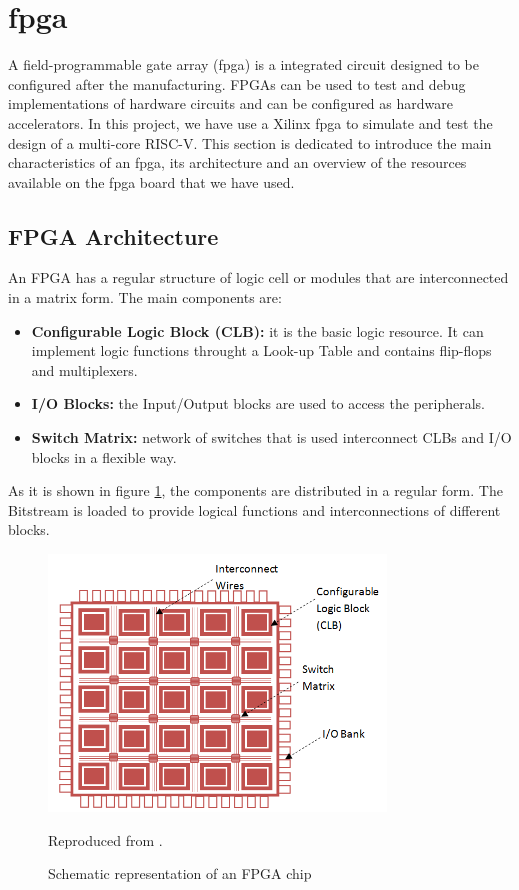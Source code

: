 \section{\gls{fpga}}

A field-programmable gate array (\gls{fpga}) is a integrated circuit designed to be configured after the manufacturing. FPGAs can be used to test and debug implementations of hardware circuits and can be configured as hardware accelerators. In this project, we have use a Xilinx \gls{fpga} to simulate and test the design of a multi-core RISC-V. This section is dedicated to introduce the main characteristics of an \gls{fpga}, its architecture and an overview of the resources available on the \gls{fpga} board that we have used.

\subsection{FPGA Architecture}
An FPGA has a regular structure of logic cell or modules that are interconnected in a matrix form. The main components are:

\begin{itemize}
	\item \textbf{Configurable Logic Block (CLB):} it is the basic logic resource. It can implement logic functions throught a Look-up Table and contains flip-flops and multiplexers. 
	\item \textbf{I/O Blocks:} the Input/Output blocks are used to access the peripherals. 
	\item \textbf{Switch Matrix:} network of switches that is used interconnect CLBs and I/O blocks in a flexible way.
\end{itemize}

As it is shown in figure \ref{fig:fpga}, the components are distributed in a regular  form. The Bitstream is loaded to provide logical functions and interconnections of different blocks. 

\begin{figure}[h]
    \centering
    \includegraphics[width=0.8\textwidth]{../presentation/images/FPGA-Architecture.png}
    \caption{Schematic representation of an FPGA chip} Reproduced from \cite{FPGA}.
    \label{fig:fpga}
\end{figure}

